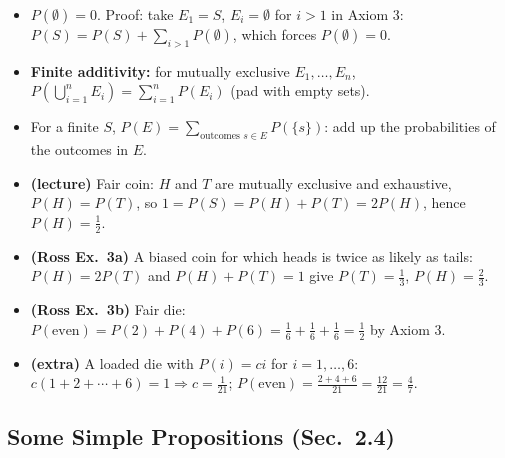 \documentclass[11pt]{article}
\let\oldsubsection\subsection
\renewcommand{\subsection}{\Needspace{14\baselineskip}\oldsubsection}
\begin{document}
\begin{thmbox}
\begin{itemize}
\item $P(\emptyset)=0$. Proof: take $E_1=S$, $E_i=\emptyset$ for $i>1$ in Axiom 3: $P(S)=P(S)+\sum_{i>1}P(\emptyset)$, which forces $P(\emptyset)=0$.
\item \textbf{Finite additivity:} for mutually exclusive $E_1,\dots,E_n$, $P\!\left(\bigcup_{i=1}^nE_i\right)=\sum_{i=1}^nP(E_i)$ (pad with empty sets).
\item For a finite $S$, $P(E)=\sum_{\text{outcomes }s\in E}P(\{s\})$: add up the probabilities of the outcomes in $E$.
\end{itemize}
\end{thmbox}

\begin{exbox}[Examples]
\begin{itemize}
\item \textbf{(lecture)} Fair coin: $H$ and $T$ are mutually exclusive and exhaustive, $P(H)=P(T)$, so $1=P(S)=P(H)+P(T)=2P(H)$, hence $P(H)=\tfrac12$.
\item \textbf{(Ross Ex.\ 3a)} A biased coin for which heads is twice as likely as tails: $P(H)=2P(T)$ and $P(H)+P(T)=1$ give $P(T)=\tfrac13$, $P(H)=\tfrac23$.
\item \textbf{(Ross Ex.\ 3b)} Fair die: $P(\text{even})=P(2)+P(4)+P(6)=\tfrac16+\tfrac16+\tfrac16=\tfrac12$ by Axiom 3.
\item \textbf{(extra)} A loaded die with $P(i)=ci$ for $i=1,\dots,6$: $c(1+2+\cdots+6)=1\Rightarrow c=\tfrac1{21}$; $P(\text{even})=\tfrac{2+4+6}{21}=\tfrac{12}{21}=\tfrac47$.
\end{itemize}
\end{exbox}

\subsection{Some Simple Propositions (Sec.\ 2.4)}
\end{document}
